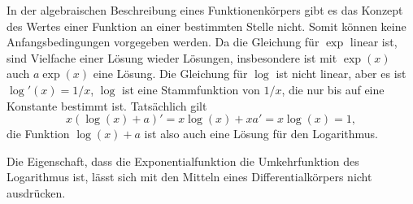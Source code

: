 In der algebraischen Beschreibung eines Funktionenkörpers gibt es
das Konzept des Wertes einer Funktion an einer bestimmten Stelle nicht.
Somit können keine Anfangsbedingungen vorgegeben werden.
Da die Gleichung für $\exp$ linear ist, sind Vielfache einer Lösung wieder
Lösungen,
insbesondere ist mit $\exp(x)$ auch $a\exp(x)$ eine Lösung.
Die Gleichung für $\log$ ist nicht linear, aber es ist
$\log'(x) = 1/x$, $\log$ ist eine Stammfunktion von $1/x$, die
nur bis auf eine Konstante bestimmt ist.
Tatsächlich gilt
\[
x(\log(x)+a)'
=
x\log(x) + xa' = x\log(x)=1,
\]
die Funktion $\log(x)+a$ ist also auch eine Lösung für den Logarithmus.

Die Eigenschaft, dass die Exponentialfunktion die Umkehrfunktion
des Logarithmus ist, lässt sich mit den Mitteln eines Differentialkörpers
nicht ausdrücken.

